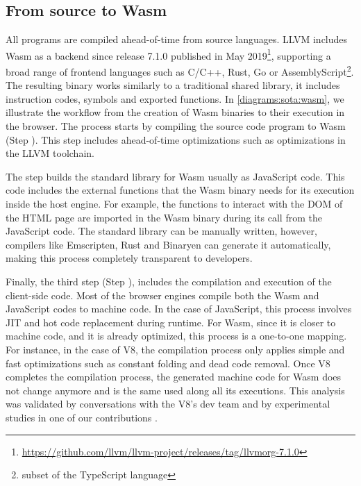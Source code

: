 
\subsection{From source to Wasm}

All \wasm programs are compiled ahead-of-time from source languages. LLVM includes Wasm  as a backend since release 7.1.0 published in May 2019\footnote{\url{https://github.com/llvm/llvm-project/releases/tag/llvmorg-7.1.0}}, supporting a broad range of frontend languages such as C/C++, Rust, Go or AssemblyScript\footnote{subset of the TypeScript language}. The resulting binary works similarly to a traditional shared library, it includes instruction codes, symbols and exported functions. In \autoref{diagrams:sota:wasm}, we illustrate the workflow from the creation of Wasm  binaries to their execution in the browser. The process starts by compiling the source code program to Wasm  (Step ). This step includes ahead-of-time optimizations such as optimizations in the LLVM toolchain. 


The step  builds the standard library for Wasm  usually as JavaScript  code. This code includes the external functions that the Wasm  binary needs for its execution inside the host engine. For example, the functions to interact with the DOM of the HTML page are imported in the Wasm  binary during its call from the JavaScript code. The standard library can be manually written, however, compilers like Emscripten, Rust and Binaryen can generate it automatically, making this process completely transparent to developers.

Finally, the third step (Step ), includes the compilation and execution of the client-side code. Most of the browser engines compile both the Wasm  and JavaScript codes to machine code. In the case of JavaScript, this process involves JIT and hot code replacement during runtime. For Wasm, since it is closer to machine code, and it is already optimized, this process is a one-to-one mapping. For instance, in the case of V8, the compilation process only applies simple and fast optimizations such as constant folding and dead code removal. Once V8 completes the compilation process, the generated machine code for Wasm does not change anymore and is the same used along all its executions. This analysis was validated by conversations with the V8's dev team and by experimental studies in one of our contributions \cite{CROW}.  

